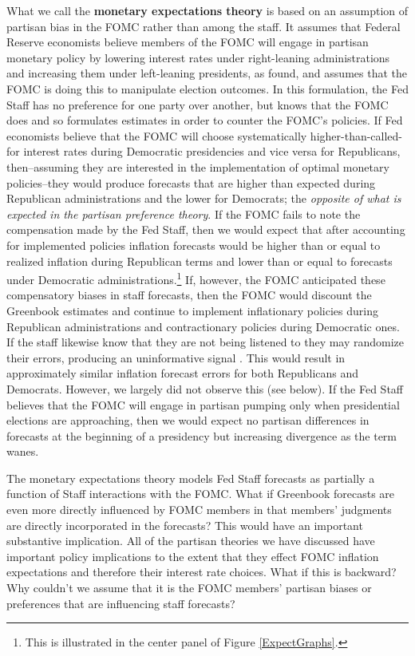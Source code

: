\documentclass[a4paper]{article}
\begin{document}
What we call the {\bf{monetary expectations theory}} is based on an assumption of partisan bias in the FOMC rather than among the staff. It assumes that Federal Reserve economists believe members of the FOMC will engage in partisan monetary policy by lowering interest rates under right-leaning administrations and increasing them under left-leaning presidents, as \cite{Clark2012} found, and assumes that the FOMC is doing this to manipulate election outcomes. In this formulation, the Fed Staff has no preference for one party over another, but knows that the FOMC does and so formulates estimates in order to counter the FOMC's policies. If Fed economists believe that the FOMC will choose systematically higher-than-called-for interest rates during Democratic presidencies and vice versa for Republicans, then--assuming they are interested in the implementation of optimal monetary policies--they would produce forecasts that are higher than expected during Republican administrations and the lower for Democrats; the {\emph{opposite of what is expected in the partisan preference theory}}. If the FOMC fails to note the compensation made by the Fed Staff, then we would expect that after accounting for implemented policies inflation forecasts would be higher than or equal to realized inflation during Republican terms and lower than or equal to forecasts under Democratic administrations.\footnote{This is illustrated in the center panel of Figure \ref{ExpectGraphs}.} If, however, the FOMC anticipated these compensatory biases in staff forecasts, then the FOMC would discount the Greenbook estimates and continue to implement inflationary policies during Republican administrations and contractionary policies during Democratic ones. If the staff likewise know that they are not being listened to they may randomize their errors, producing an uninformative signal \citep{Crawford1982}. This would result in approximately similar inflation forecast errors for both Republicans and Democrats. However, we largely did not observe this (see below). If the Fed Staff believes that the FOMC will engage in partisan pumping only when presidential elections are approaching, then we would expect no partisan differences in forecasts at the beginning of a presidency but increasing divergence as the term wanes.

The monetary expectations theory models Fed Staff forecasts as partially a function of Staff interactions with the FOMC. What if Greenbook forecasts are even more directly influenced by FOMC members in that members' judgments are directly incorporated in the forecasts? This would have an important substantive implication. All of the partisan theories we have discussed have important policy implications to the extent that they effect FOMC inflation expectations and therefore their interest rate choices. What if this is backward? Why couldn't we assume that it is the FOMC members' partisan biases or preferences that are influencing staff forecasts? 
\end{document}
